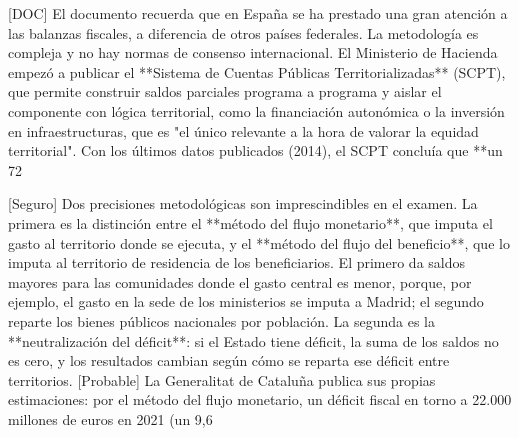 \documentclass[10pt,a4paper]{article}
\begin{document}
[DOC] El documento recuerda que en España se ha prestado una gran atención a las balanzas fiscales, a diferencia de otros países federales. La metodología es compleja y no hay normas de consenso internacional. El Ministerio de Hacienda empezó a publicar el **Sistema de Cuentas Públicas Territorializadas** (SCPT), que permite construir saldos parciales programa a programa y aislar el componente con lógica territorial, como la financiación autonómica o la inversión en infraestructuras, que es "el único relevante a la hora de valorar la equidad territorial". Con los últimos datos publicados (2014), el SCPT concluía que **un 72%

[Seguro] Dos precisiones metodológicas son imprescindibles en el examen. La primera es la distinción entre el **método del flujo monetario**, que imputa el gasto al territorio donde se ejecuta, y el **método del flujo del beneficio**, que lo imputa al territorio de residencia de los beneficiarios. El primero da saldos mayores para las comunidades donde el gasto central es menor, porque, por ejemplo, el gasto en la sede de los ministerios se imputa a Madrid; el segundo reparte los bienes públicos nacionales por población. La segunda es la **neutralización del déficit**: si el Estado tiene déficit, la suma de los saldos no es cero, y los resultados cambian según cómo se reparta ese déficit entre territorios. [Probable] La Generalitat de Cataluña publica sus propias estimaciones: por el método del flujo monetario, un déficit fiscal en torno a 22.000 millones de euros en 2021 (un 9,6%
\end{document}
